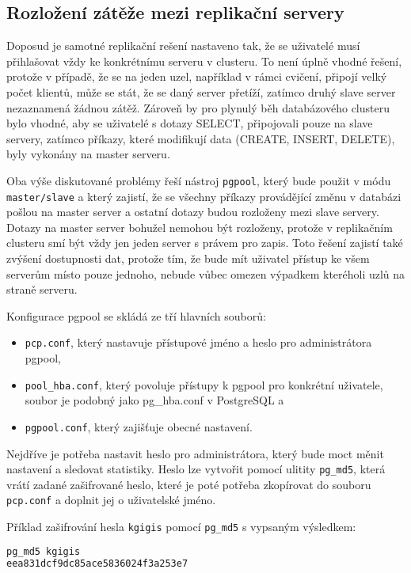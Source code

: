 \subsection{Rozložení zátěže mezi replikační servery}

Doposud je samotné replikační rešení nastaveno tak, že se uživatelé musí přihlašovat vždy ke konkrétnímu serveru v clusteru. To není úplně vhodné řešení, protože v případě, že se na jeden uzel, například v rámci cvičení, připojí velký počet klientů, může se stát, že se daný server přetíží, zatímco druhý slave server nezaznamená žádnou zátěž. Zároveň by pro plynulý běh databázového clusteru bylo vhodné, aby se uživatelé s dotazy SELECT, připojovali pouze na slave servery, zatímco příkazy, které modifikují data (CREATE, INSERT, DELETE), byly vykonány na master serveru. 

Oba výše diskutované problémy řeší nástroj \texttt{pgpool}, který bude použit v módu \texttt{master/slave} a který zajistí, že se všechny příkazy provádějící změnu v databázi pošlou na master server a ostatní dotazy budou rozloženy mezi slave servery. Dotazy na master server bohužel nemohou být rozloženy, protože v replikačním clusteru smí být vždy jen jeden server s právem pro zapis. Toto řešení zajistí také zvýšení dostupnosti dat, protože tím, že bude mít uživatel přístup ke všem serverům místo pouze jednoho, nebude vůbec omezen výpadkem kteréholi uzlů na straně serveru.

    Konfigurace pgpool se skládá ze tří hlavních souborů:
\begin{itemize}
  \item \texttt{pcp.conf}, který nastavuje přístupové jméno a heslo pro administrátora pgpool, 
  \item \texttt{pool\_hba.conf}, který povoluje přístupy k pgpool pro konkrétní uživatele, soubor je podobný jako pg\_hba.conf v PostgreSQL a 
  \item \texttt{pgpool.conf}, který zajišťuje obecné nastavení. 
\end{itemize}

Nejdříve je potřeba nastavit heslo pro administrátora, který bude moct měnit nastavení a sledovat statistiky. Heslo lze vytvořit pomocí ulitity \texttt{pg\_md5}, která vrátí zadané zašifrované heslo, které je poté potřeba zkopírovat do souboru \texttt{pcp.conf} a doplnit jej o uživatelské jméno.

Příklad zašifrování hesla \texttt{kgigis} pomocí \texttt{pg\_md5} s vypsaným výsledkem:
\begin{lstlisting}[language=ruby,morekeywords={pg_md5}]
pg_md5 kgigis
eea831dcf9dc85ace5836024f3a253e7
\end{lstlisting}

